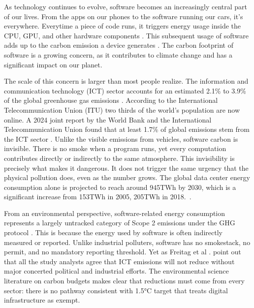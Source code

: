 As technology continues to evolve, software becomes an increasingly central part of our lives. From the apps on our phones to the software running our cars, it's everywhere. Everytime a  piece of code runs, it triggers energy usage inside the CPU, GPU, and other hardware components \cite{greenuk_footprint}. This subsequent usage of software adds up to the carbon emission a device generates \cite{thoughtworks_carbon_intensity}. The carbon footprint of software is a growing concern, as it contributes to climate change and has a significant impact on our planet. 

The scale of this concern is larger than most people realize. The information and communication technology (ICT) sector accounts for an estimated 2.1\% to 3.9\% of the global greenhouse gas emissions \cite{ict_stat}. According to the International Telecommunication Union (ITU) two thirds of the world's population are now online. A 2024 joint report by the World Bank and the International Telecommunication Union found that at least 1.7\% of global emissions stem from the ICT sector \cite{worldbank_itu}.  Unlike the visible emissions from vehicles, software carbon is invisible. There is no smoke when a program runs, yet every computation contributes directly or indirectly to the same atmosphere. This invisibility is precisely what makes it dangerous. It does not trigger the same urgency that the physical pollution does, even as the number grows. The global data center energy consumption alone is projected to reach around 945TWh by 2030, which is a significant increase from 153TWh in 2005, 205TWh in 2018.~\cite{iea_energy_consumption, masanet_energy_consumption}. 


From an environmental perspective, software-related energy consumption represents a largely untracked category of Scope 2 emissions under the GHG protocol \cite{10.1007/978-3-031-53227-6_31}. This is because the energy used by software is often indirectly measured or reported. Unlike industrial polluters, software has no smokestack, no permit, and no mandatory reporting threshold. Yet as Freitag et al \cite{ict_stat}. point out that all the study analysts agree that ICT emissions will not reduce without major concerted political and industrial efforts. The environmental science literature on carbon budgets makes clear that reductions must come from every sector: there is no pathway consistent with 1.5°C target that treats digital infrastructure as exempt.


